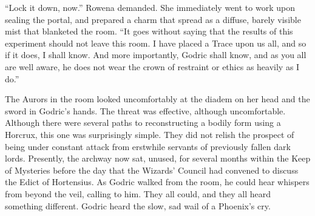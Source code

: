 \SmallVSpace
“Lock it down, now.” Rowena demanded. She immediately went to work upon sealing the portal, and prepared a charm that spread as a diffuse, barely visible mist that blanketed the room. “It goes without saying that the results of this experiment should not leave this room. I have placed a Trace upon us all, and so if it does, I shall know. And more importantly, Godric shall know, and as you all are well aware, he does not wear the crown of restraint or ethics as heavily as I do.”

The Aurors in the room looked uncomfortably at the diadem on her head and the sword in Godric’s hands. The threat was effective, although uncomfortable. Although there were several paths to reconstructing a bodily form using a Horcrux, this one was surprisingly simple. They did not relish the prospect of being under constant attack from erstwhile servants of previously fallen dark lords.
\SmallVSpace
Presently, the archway now sat, unused, for several months within the Keep of Mysteries before the day that the Wizards’ Council had convened to discuss the Edict of Hortensius. As Godric walked from the room, he could hear whispers from beyond the veil, calling to him. They all could, and they all heard something different.
\SomeVSpace
Godric heard the slow, sad wail of a Phoenix’s cry.
\simpleline	


